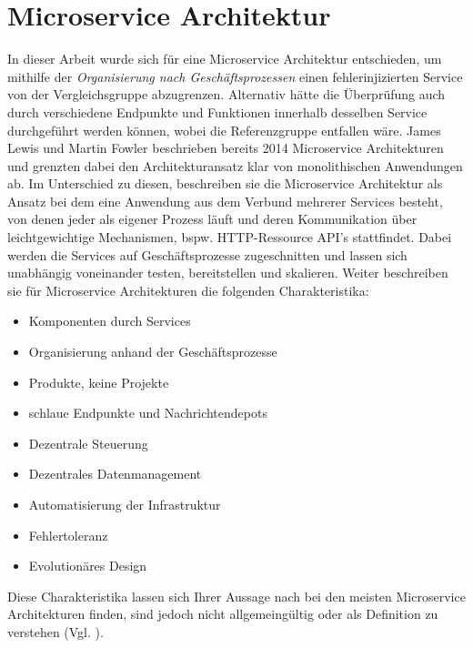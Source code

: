 \documentclass[
12pt,
a4paper,
twoside,
openright
]{report}
\begin{document}
	\section{Microservice Architektur}
	In dieser Arbeit wurde sich für eine Microservice Architektur entschieden, um mithilfe der \textit{Organisierung nach Geschäftsprozessen} einen fehlerinjizierten Service von der Vergleichsgruppe abzugrenzen. Alternativ hätte die Überprüfung auch durch verschiedene Endpunkte und Funktionen innerhalb desselben Service durchgeführt werden können, wobei die Referenzgruppe entfallen wäre. James Lewis und Martin Fowler beschrieben bereits 2014 Microservice Architekturen und grenzten dabei den Architekturansatz klar von monolithischen Anwendungen ab.  Im Unterschied zu diesen, beschreiben sie die Microservice Architektur als Ansatz bei dem eine Anwendung aus dem Verbund mehrerer Services besteht, von denen jeder als eigener Prozess läuft und deren Kommunikation über leichtgewichtige Mechanismen, bspw. HTTP-Ressource API's stattfindet. Dabei werden die Services auf Geschäftsprozesse zugeschnitten und lassen sich unabhängig voneinander testen, bereitstellen und skalieren. Weiter beschreiben sie für Microservice Architekturen die folgenden Charakteristika: 
	\begin{itemize}
 		\item Komponenten durch Services
		\item Organisierung anhand der Geschäftsprozesse
		\item Produkte, keine Projekte
		\item schlaue Endpunkte und Nachrichtendepots
		\item Dezentrale Steuerung
		\item Dezentrales Datenmanagement
		\item Automatisierung der Infrastruktur
		\item Fehlertoleranz
		\item Evolutionäres Design
	\end{itemize}
	Diese Charakteristika lassen sich Ihrer Aussage nach bei den meisten Microservice Architekturen finden, sind jedoch nicht allgemeingültig oder als Definition zu verstehen
	(Vgl. \parencite{Fowler2014}).
	
\end{document}
